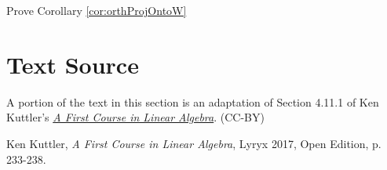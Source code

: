 \documentclass{ximera}
\begin{document}
\begin{problem}\label{prob:proofCor}
Prove Corollary \ref{cor:orthProjOntoW}
\end{problem}
  
\section*{Text Source}
A portion of the text in this section is an adaptation of Section 4.11.1 of Ken Kuttler's \href{https://open.umn.edu/opentextbooks/textbooks/a-first-course-in-linear-algebra-2017}{\it A First Course in Linear Algebra}. (CC-BY)

Ken Kuttler, {\it  A First Course in Linear Algebra}, Lyryx 2017, Open Edition, p. 233-238.  
\end{document}

